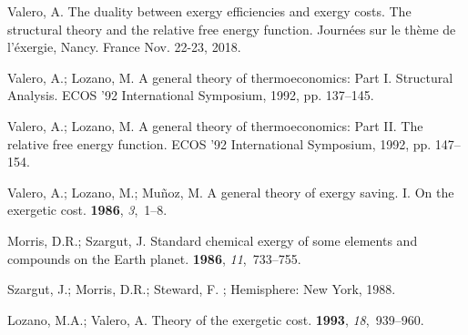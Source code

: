\documentclass[energies,article,submit,moreauthors,pdftex]{Definitions/mdpi}
\begin{document}
\begin{thebibliography}{99}
	\providecommand{\natexlab}[1]{#1}
	Valero, A.
	\newblock The duality between exergy efficiencies and exergy costs. The structural theory and the relative free energy function.
	\newblock Journées sur le thème de l'éxergie, Nancy. France Nov. 22-23, 2018. 
	
	Valero, A.; Lozano, M.
	\newblock A general theory of thermoeconomics: Part I. Structural Analysis.
	\newblock  ECOS '92 International Symposium, 1992, pp. 137--145.
	
	Valero, A.; Lozano, M.
	\newblock A general theory of thermoeconomics: Part II. The relative free energy function.
	\newblock  ECOS '92 International Symposium,  1992, pp. 147--154.
	
	Valero, A.; Lozano, M.; Muñoz, M.
	\newblock A general theory of exergy saving. I. On the exergetic cost.
	 {\bf 1986}, {\em 3},~1--8.
	
	Morris, D.R.; Szargut, J.
	\newblock Standard chemical exergy of some elements and compounds on the Earth planet.
	 {\bf 1986}, {\em 11},~733--755.
	
	Szargut, J.; Morris, D.R.; Steward, F.
	; Hemisphere: New York,  1988.

	Lozano, M.A.; Valero, A.
	\newblock Theory of the exergetic cost.
	 {\bf 1993}, {\em 18},~939--960.
	

\end{thebibliography}
\end{document}
